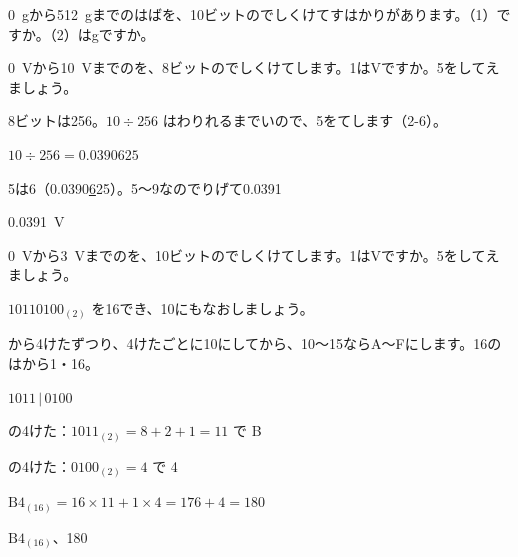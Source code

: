 \begin{jibun}
\qty{0}{g}から\qty{512}{g}までのはばを、10ビットのでしくけてすはかりがあります。（1）\nobreak {}ですか。（2）はgですか。
\end{jibun}

\begin{reidai}
\qty{0}{V}から\qty{10}{V}までのを、8ビットのでしくけてします。1はVですか。5をしてえましょう。\par
\kangaekata 8ビットは256。$10\div256$ はわりれるまでいので、5をてします（2-6）。\par
\shiki $10\div256=0.0390625$\par
\hspace*{2.6\zw}5は6（0.0390\underline{6}25）。5〜9なのでりげて0.0391\par
\kotae {}\qty{0.0391}{V}
\end{reidai}

\begin{jibun}
\qty{0}{V}から\qty{3}{V}までのを、10ビットのでしくけてします。1はVですか。5をしてえましょう。
\end{jibun}

\begin{reidai}[16\R{進数}{しん|すう}で\R{書}{か}く]
$10110100_{(2)}$ を16でき、10にもなおしましょう。\par
\kangaekata {}から4けたずつり、4けたごとに10にしてから、10〜15ならA〜Fにします。16のはから1・16。\par
\shiki $1011\,|\,0100$\par
\hspace*{2.6\zw}の4けた：$1011_{(2)}=8+2+1=11$ で B\par
\hspace*{2.6\zw}の4けた：$0100_{(2)}=4$ で 4\par
\hspace*{2.6\zw}$\mathrm{B4}_{(16)}=16\times11+1\times4=176+4=180$\par
\kotae $\mathrm{B4}_{(16)}$、180
\end{reidai}

